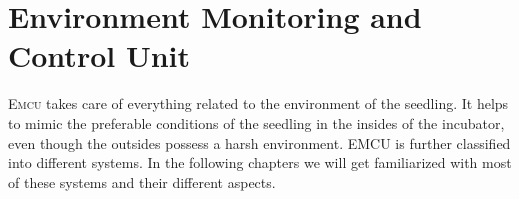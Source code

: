 \documentclass[../../main]{subfiles}
\begin{document}
\section{Environment Monitoring and Control Unit} \label{sec:}

\textsc{Emcu} takes care of everything related to the environment of
the seedling. It helps to mimic the preferable conditions of the
seedling in the insides of the incubator, even though the outsides
possess a harsh environment. EMCU is further classified into different
systems. In the following chapters we will get familiarized with most
of these systems and their different aspects.

%







%
\end{document}

